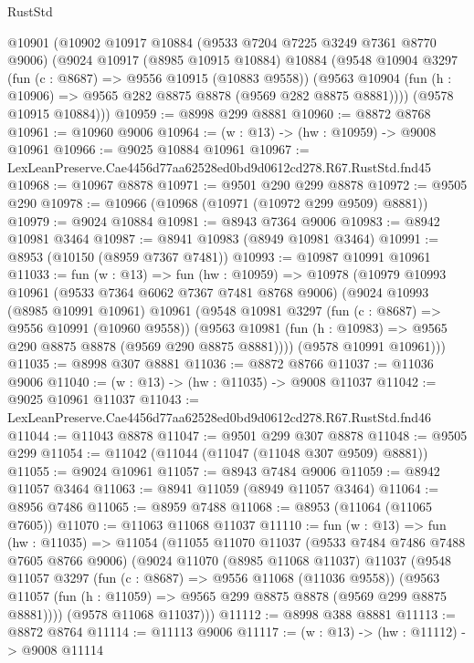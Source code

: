 \begin{lexlean}{RustStd}
\begin{coremodule}
  @10901
    (@10902
      @10917
      @10884
      (@9533 @7204 @7225 @3249 @7361 @8770 @9006)
      (@9024
        @10917
        (@8985 @10915 @10884)
        @10884
        (@9548
          @10904
          @3297
          (fun (c : @8687) => @9556 @10915 (@10883 @9558))
          (@9563 @10904 (fun (h : @10906) => @9565 @282 @8875 @8878 (@9569 @282 @8875 @8881))))
        (@9578 @10915 @10884)))
@10959 := @8998 @299 @8881
@10960 := @8872 @8768
@10961 := @10960 @9006
@10964 := (w : @13) -> (hw : @10959) -> @9008 @10961
@10966 := @9025 @10884 @10961
@10967 := LexLeanPreserve.Cae4456d77aa62528ed0bd9d0612cd278.R67.RustStd.fnd45
@10968 := @10967 @8878
@10971 := @9501 @290 @299 @8878
@10972 := @9505 @290
@10978 := @10966 (@10968 (@10971 (@10972 @299 @9509) @8881))
@10979 := @9024 @10884
@10981 := @8943 @7364 @9006
@10983 := @8942 @10981 @3464
@10987 := @8941 @10983 (@8949 @10981 @3464)
@10991 := @8953 (@10150 (@8959 @7367 @7481))
@10993 := @10987 @10991 @10961
@11033 := fun (w : @13) =>
  fun (hw : @10959) =>
  @10978
    (@10979
      @10993
      @10961
      (@9533 @7364 @6062 @7367 @7481 @8768 @9006)
      (@9024
        @10993
        (@8985 @10991 @10961)
        @10961
        (@9548
          @10981
          @3297
          (fun (c : @8687) => @9556 @10991 (@10960 @9558))
          (@9563 @10981 (fun (h : @10983) => @9565 @290 @8875 @8878 (@9569 @290 @8875 @8881))))
        (@9578 @10991 @10961)))
@11035 := @8998 @307 @8881
@11036 := @8872 @8766
@11037 := @11036 @9006
@11040 := (w : @13) -> (hw : @11035) -> @9008 @11037
@11042 := @9025 @10961 @11037
@11043 := LexLeanPreserve.Cae4456d77aa62528ed0bd9d0612cd278.R67.RustStd.fnd46
@11044 := @11043 @8878
@11047 := @9501 @299 @307 @8878
@11048 := @9505 @299
@11054 := @11042 (@11044 (@11047 (@11048 @307 @9509) @8881))
@11055 := @9024 @10961
@11057 := @8943 @7484 @9006
@11059 := @8942 @11057 @3464
@11063 := @8941 @11059 (@8949 @11057 @3464)
@11064 := @8956 @7486
@11065 := @8959 @7488
@11068 := @8953 (@11064 (@11065 @7605))
@11070 := @11063 @11068 @11037
@11110 := fun (w : @13) =>
  fun (hw : @11035) =>
  @11054
    (@11055
      @11070
      @11037
      (@9533 @7484 @7486 @7488 @7605 @8766 @9006)
      (@9024
        @11070
        (@8985 @11068 @11037)
        @11037
        (@9548
          @11057
          @3297
          (fun (c : @8687) => @9556 @11068 (@11036 @9558))
          (@9563 @11057 (fun (h : @11059) => @9565 @299 @8875 @8878 (@9569 @299 @8875 @8881))))
        (@9578 @11068 @11037)))
@11112 := @8998 @388 @8881
@11113 := @8872 @8764
@11114 := @11113 @9006
@11117 := (w : @13) -> (hw : @11112) -> @9008 @11114

\end{coremodule}
\end{lexlean}
